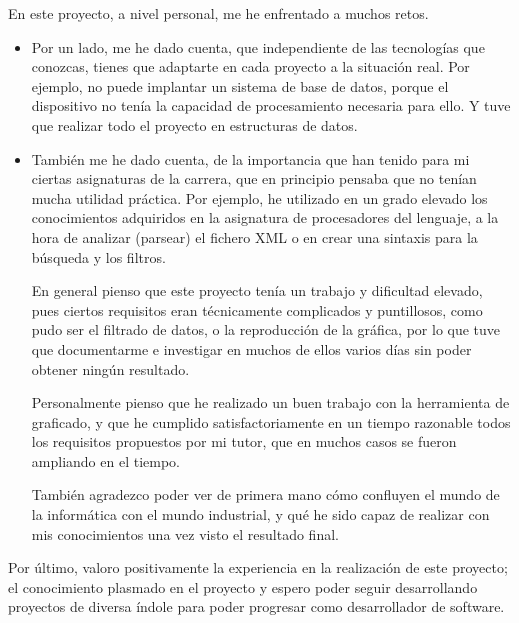 En este proyecto, a nivel personal, me he enfrentado a muchos retos. 
\begin{itemize}
	\item Por un lado, me he dado cuenta, que independiente de las tecnologías que conozcas, tienes que adaptarte en cada proyecto a la situación real. Por ejemplo, no puede implantar un sistema de base de datos, porque el dispositivo no tenía la capacidad de procesamiento necesaria para ello. Y tuve que realizar todo el proyecto en estructuras de datos.
 	\item También me he dado cuenta, de la importancia que han tenido para mi ciertas asignaturas de la carrera, que en principio pensaba que no tenían mucha utilidad práctica. Por ejemplo, he utilizado en un grado elevado los conocimientos adquiridos en la asignatura de procesadores del lenguaje, a la hora de analizar (parsear) el fichero XML o en crear una sintaxis para la búsqueda y los filtros.
 	
En general pienso que este proyecto tenía un trabajo y dificultad elevado, pues ciertos requisitos eran técnicamente complicados y puntillosos, como pudo ser el filtrado de datos, o la reproducción de la gráfica, por lo que tuve que documentarme e investigar en muchos de ellos varios días sin poder obtener ningún resultado.

Personalmente pienso que he realizado un buen trabajo con la herramienta de graficado, y que he cumplido satisfactoriamente en un tiempo razonable todos los requisitos propuestos por mi tutor, que en muchos casos se fueron ampliando en el tiempo.

También agradezco poder ver de primera mano cómo confluyen el mundo de la informática con el mundo industrial, y qué he sido capaz de realizar con mis conocimientos una vez visto el resultado final.

\end{itemize}

Por último, valoro positivamente la experiencia en la realización de este proyecto; el conocimiento plasmado en el proyecto y espero poder seguir desarrollando proyectos de diversa índole para poder progresar como desarrollador de software.


